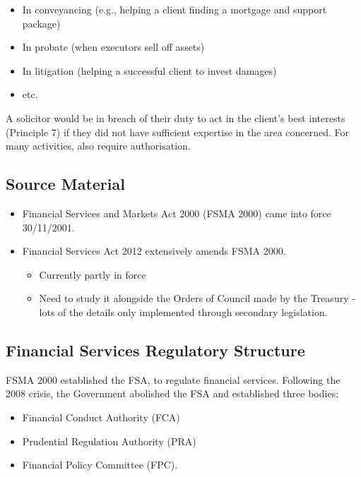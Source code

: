\documentclass[
]{article}
\providecommand{\tightlist}{%
  \setlength{\itemsep}{0pt}\setlength{\parskip}{0pt}}
\begin{document}
\begin{itemize}
\tightlist
\item
  In conveyancing (e.g., helping a client finding a mortgage and support
  package)
\item
  In probate (when executors sell off assets)
\item
  In litigation (helping a successful client to invest damages)
\item
  etc.
\end{itemize}

A solicitor would be in breach of their duty to act in the client's best
interests (Principle 7) if they did not have sufficient expertise in the
area concerned. For many activities, also require authorisation.

\hypertarget{source-material}{%
\subsection{Source Material}\label{source-material}}

\begin{itemize}
\tightlist
\item
  Financial Services and Markets Act 2000 (FSMA 2000) came into force
  30/11/2001.
\item
  Financial Services Act 2012 extensively amends FSMA 2000.

  \begin{itemize}
  \tightlist
  \item
    Currently partly in force
  \item
    Need to study it alongside the Orders of Council made by the
    Treasury - lots of the details only implemented through secondary
    legislation.
  \end{itemize}
\end{itemize}

\hypertarget{financial-services-regulatory-structure}{%
\subsection{Financial Services Regulatory
Structure}\label{financial-services-regulatory-structure}}

FSMA 2000 established the FSA, to regulate financial services. Following
the 2008 crisis, the Government abolished the FSA and established three
bodies:

\begin{itemize}
\tightlist
\item
  Financial Conduct Authority (FCA)
\item
  Prudential Regulation Authority (PRA)
\item
  Financial Policy Committee (FPC).
\end{itemize}
\end{document}
